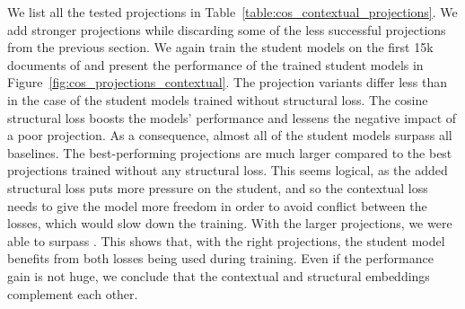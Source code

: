 We list all the tested projections in
Table~\ref{table:cos_contextual_projections}. We add stronger projections
while discarding some of the less successful projections from the previous
section. We again train the student models on the first 15k documents of
 and present the performance of the trained student models in
Figure~\ref{fig:cos_projections_contextual}. The projection variants differ less than in the case of the student models trained without structural loss.
The cosine structural loss boosts the models' performance and lessens the
negative impact of a poor projection. As a consequence, almost all of the
student models surpass all baselines. The best-performing projections are much
larger compared to the best projections trained without any structural loss.
This seems logical, as the added structural loss puts more pressure on the
student, and so the contextual loss needs to give the model more freedom in
order to avoid conflict between the losses, which would slow down the training.
With the larger projections, we were able to surpass
. This shows that, with the right projections, the student model benefits from both losses being used during
training. Even if the performance gain is not huge, we conclude that the
contextual and structural embeddings complement each other.

